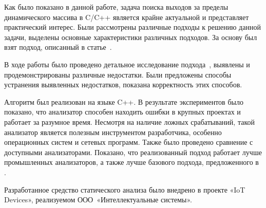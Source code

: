 
Как было показано в данной работе, задача поиска выходов за пределы
динамического массива в C/C++ является крайне актуальной и
представляет практический интерес. Были рассмотрены различные подходы
к решению данной задачи, выделены основные характеристики различных
подходов. За основу был взят подход, описанный в
статье~\cite{li2010practical}.

В ходе работы было проведено детальное исследование
подхода~\cite{li2010practical}, выявлены и продемонстрированы
различные недостатки. Были предложены способы устранения выявленных
недостатков, показана корректность этих способов.

Алгоритм был реализован на языке C++. В результате экспериментов было
показано, что анализатор способен находить ошибки в крупных проектах и
работает за разумное время. Несмотря на наличие ложных срабатываний,
такой анализатор является полезным инструментом разработчика, особенно
операционных систем и сетевых программ. Также было проведено сравнение
с доступными анализаторами. Показано, что реализованный подход
работает лучше промышленных анализаторов, а также лучше базового
подхода, предложенного в \cite{li2010practical}.


Разработанное средство статического анализа было внедрено в проекте
«IoT Devices», реализуемом ООО~«Интеллектуальные системы».

\FloatBarrier

